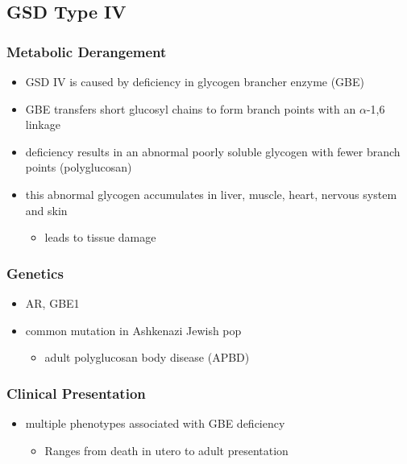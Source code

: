 \documentclass{scrartcl}
\begin{document}
\subsection{GSD Type IV}
\label{sec:orgea023bf}
\subsubsection{Metabolic Derangement}
\label{sec:org38bda1c}
\begin{itemize}
\item GSD IV is caused by deficiency in glycogen brancher enzyme (GBE)
\item GBE transfers short glucosyl chains to form branch points with an
\(\alpha\)-1,6 linkage
\item deficiency results in an abnormal poorly soluble glycogen with fewer branch points (polyglucosan)
\item this abnormal glycogen accumulates in liver, muscle, heart, nervous system and skin
\begin{itemize}
\item leads to tissue damage
\end{itemize}
\end{itemize}

\subsubsection{Genetics}
\label{sec:org955f932}
\begin{itemize}
\item AR, GBE1
\item common mutation in Ashkenazi Jewish pop
\begin{itemize}
\item adult polyglucosan body disease (APBD)
\end{itemize}
\end{itemize}

\subsubsection{Clinical Presentation}
\label{sec:org3dd454c}

\begin{itemize}
\item multiple phenotypes associated with GBE deficiency
\begin{itemize}
\item Ranges from death in utero to adult presentation
\end{itemize}
\end{itemize}
\end{document}
